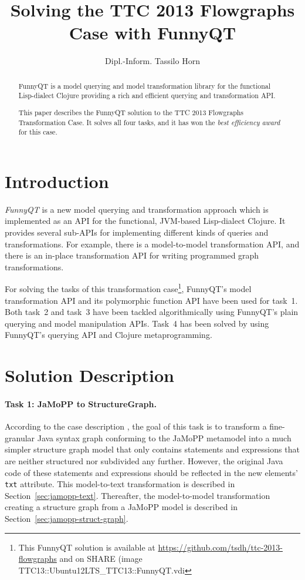 \documentclass[submission]{eptcs}
\title{Solving the TTC 2013 Flowgraphs Case with FunnyQT}
\author{Dipl.-Inform. Tassilo Horn
  \email{horn@uni-koblenz.de}
  \institute{Institute for Software Technology, University Koblenz-Landau, Germany}}
\begin{document}
\maketitle

\begin{abstract}
  FunnyQT is a model querying and model transformation library for the
  functional Lisp-dialect Clojure providing a rich and efficient querying and
  transformation API.

  This paper describes the FunnyQT solution to the TTC 2013 Flowgraphs
  Transformation Case.  It solves all four tasks, and it has won the \emph{best
    efficiency award} for this case.
\end{abstract}

\section{Introduction}
\label{sec:introduction}

\emph{FunnyQT} is a new model querying and transformation approach which is
implemented as an API for the functional, JVM-based Lisp-dialect Clojure.  It
provides several sub-APIs for implementing different kinds of queries and
transformations.  For example, there is a model-to-model transformation API,
and there is an in-place transformation API for writing programmed graph
transformations.

For solving the tasks of this transformation case\footnote{This FunnyQT
  solution is available at \url{https://github.com/tsdh/ttc-2013-flowgraphs}
  and on SHARE (image \textsf{TTC13::Ubuntu12LTS\_TTC13::FunnyQT.vdi}},
FunnyQT's model transformation API and its polymorphic function API have been
used for task~1.  Both task~2 and task~3 have been tackled algorithmically
using FunnyQT's plain querying and model manipulation APIs.  Task~4 has been
solved by using FunnyQT's querying API and Clojure metaprogramming.

\section{Solution Description}
\label{sec:solution-description}


\paragraph{Task 1: JaMoPP to StructureGraph.}
\label{sec:task-1}

According to the case description \cite{flowgraphcasedesc}, the goal of this
task is to transform a fine-granular Java syntax graph conforming to the JaMoPP
metamodel \cite{jamopp09} into a much simpler structure graph model that only
contains statements and expressions that are neither structured nor subdivided
any further.  However, the original Java code of these statements and
expressions should be reflected in the new elements' \verb|txt| attribute.
This model-to-text transformation is described in
Section~\ref{sec:jamopp-text}.  Thereafter, the model-to-model transformation
creating a structure graph from a JaMoPP model is described in
Section~\ref{sec:jamopp-struct-graph}.
\end{document}
